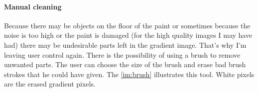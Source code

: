 \documentclass[11pt]{article}
\begin{document}
	\paragraph{Manual cleaning} Because there may be objects on the floor of the paint or sometimes because the noise is too high or the paint is damaged (for the high quality images I may have had) there may be undesirable parts left in the gradient image. That's why I'm leaving user control again. There is the possibility of using a brush to remove unwanted parts. The user can choose the size of the brush and erase bad brush strokes that he could have given. The \figurename \ref{im:brush} illustrates this tool. White pixels are the erased gradient pixels.
	
	\begin{figure}[h]
		\centering
\end{figure}
\end{document}
